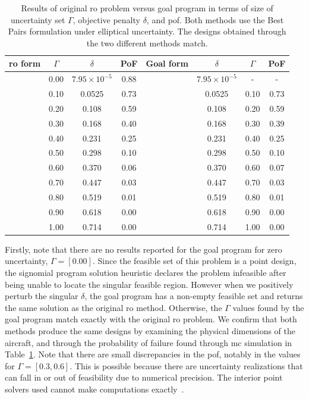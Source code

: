 \begin{table}
\begin{center}
\caption{\label{tab:deltaVsGamma} Results of original \gls{ro} problem versus goal program in terms
of size of uncertainty set $\Gamma$, objective penalty $\delta$, and \gls{pof}. Both methods
use the Best Pairs formulation under elliptical uncertainty. The designs obtained through
the two different methods match.}
\begin{tabular}{c c c c c c c c}
\hline
 \gls{ro} form & $\Gamma$ & $\delta$ & PoF & Goal form & $\delta$ & $\Gamma$ & PoF\\
\hline
& 0.00 & $7.95 \times 10^{-5}$ & 0.88 & & $7.95 \times 10^{-5}$ & - & - \\
& 0.10 & 0.0525 & 0.73 & & 0.0525 & 0.10 & 0.73 \\
& 0.20 & 0.108 & 0.59 & & 0.108 & 0.20 & 0.59 \\
& 0.30 & 0.168 & 0.40 & & 0.168 & 0.30 & 0.39 \\
& 0.40 & 0.231 & 0.25 & & 0.231 & 0.40 & 0.25 \\
& 0.50 & 0.298 & 0.10 & & 0.298 & 0.50 & 0.10 \\
& 0.60 & 0.370 & 0.06 & & 0.370 & 0.60 & 0.07 \\
& 0.70 & 0.447 & 0.03 & & 0.447 & 0.70 & 0.03 \\
& 0.80 & 0.519 & 0.01 & & 0.519 & 0.80 & 0.01 \\
& 0.90 & 0.618 & 0.00 & & 0.618 & 0.90 & 0.00 \\
& 1.00 & 0.714 & 0.00 & & 0.714 & 1.00 & 0.00 \\
\end{tabular}
\end{center}
\end{table}

Firstly, note that there are no results reported for the goal program
for zero uncertainty, $\Gamma = [0.00]$.
Since the feasible set of this problem is a point design, the signomial program
solution heuristic declares the problem infeasible after being
unable to locate the singular feasible region. However when we positively perturb
the singular $\delta$, the goal program has a non-empty feasible set and
returns the same solution as the original \gls{ro} method.
Otherwise, the $\Gamma$ values found by the goal program match exactly
with the original \gls{ro} problem. We confirm that both methods produce
the same designs by examining the physical dimensions of the aircraft, and through the probability
of failure found through \gls{mc} simulation in Table~\ref{tab:deltaVsGamma}.
Note that there are small discrepancies
in the \gls{pof}, notably in the values for $\Gamma = [0.3, 0.6]$. This is
possible because there are uncertainty realizations that can fall
in or out of feasibility due to numerical precision. The interior point solvers
used cannot make computations exactly~\cite{Nesterov1994}.

